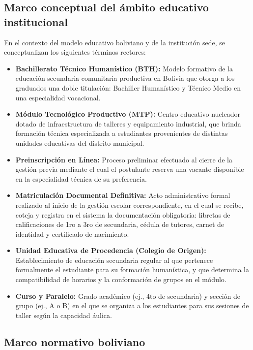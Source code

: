 \subsection{Marco conceptual del ámbito educativo institucional}

En el contexto del modelo educativo boliviano y de la institución sede, se conceptualizan los siguientes términos rectores:

\begin{itemize}
    \item \textbf{Bachillerato Técnico Humanístico (BTH):} Modelo formativo de la educación secundaria comunitaria productiva en Bolivia que otorga a los graduados una doble titulación: Bachiller Humanístico y Técnico Medio en una especialidad vocacional.
    \item \textbf{Módulo Tecnológico Productivo (MTP):} Centro educativo nucleador dotado de infraestructura de talleres y equipamiento industrial, que brinda formación técnica especializada a estudiantes provenientes de distintas unidades educativas del distrito municipal.
    \item \textbf{Preinscripción en Línea:} Proceso preliminar efectuado al cierre de la gestión previa mediante el cual el postulante reserva una vacante disponible en la especialidad técnica de su preferencia.
    \item \textbf{Matriculación Documental Definitiva:} Acto administrativo formal realizado al inicio de la gestión escolar correspondiente, en el cual se recibe, coteja y registra en el sistema la documentación obligatoria: libretas de calificaciones de 1ro a 3ro de secundaria, cédula de tutores, carnet de identidad y certificado de nacimiento.
    \item \textbf{Unidad Educativa de Procedencia (Colegio de Origen):} Establecimiento de educación secundaria regular al que pertenece formalmente el estudiante para su formación humanística, y que determina la compatibilidad de horarios y la conformación de grupos en el módulo.
    \item \textbf{Curso y Paralelo:} Grado académico (ej., 4to de secundaria) y sección de grupo (ej., A o B) en el que se organiza a los estudiantes para sus sesiones de taller según la capacidad áulica.
\end{itemize}

\subsection{Marco normativo boliviano}

